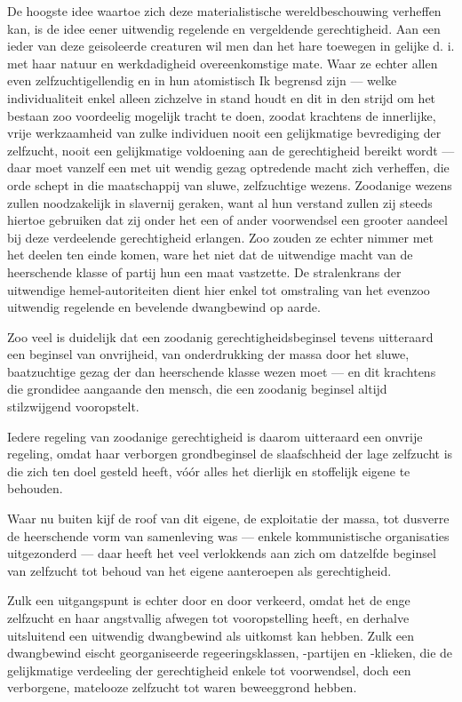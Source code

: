 \documentclass[a4paper, 12pt, oneside, dutch]{article}
\begin{document}
De hoogste idee waartoe zich deze materialistische wereldbeschouwing verheffen kan, is de idee eener uitwendig regelende en vergeldende gerechtigheid. Aan een ieder van deze geisoleerde creaturen wil men dan het hare toewegen in gelijke d. i. met haar natuur en werkdadigheid overeenkomstige mate. Waar ze echter allen even zelfzuchtigellendig en in hun atomistisch Ik begrensd zijn --- welke individualiteit enkel alleen zichzelve in stand houdt en dit in den strijd om het bestaan zoo voordeelig mogelijk tracht te doen, zoodat krachtens de innerlijke, vrije werkzaamheid van zulke individuen nooit een gelijkmatige bevrediging der zelfzucht, nooit een gelijkmatige voldoening aan de gerechtigheid bereikt wordt --- daar moet vanzelf een met uit wendig gezag optredende macht zich verheffen, die orde schept in die maatschappij van sluwe, zelfzuchtige wezens. Zoodanige wezens zullen noodzakelijk in slavernij geraken, want al hun verstand zullen zij steeds hiertoe gebruiken dat zij onder het een of ander voorwendsel een grooter aandeel bij deze verdeelende gerechtigheid erlangen. Zoo zouden ze echter nimmer met het deelen ten einde komen, ware het niet dat de uitwendige macht van de heerschende klasse of partij hun een maat vastzette. De stralenkrans der uitwendige hemel-autoriteiten dient hier enkel tot omstraling van het evenzoo uitwendig regelende en bevelende dwangbewind op aarde.

Zoo veel is duidelijk dat een zoodanig gerechtigheidsbeginsel tevens uitteraard een beginsel van onvrijheid, van onderdrukking der massa door het sluwe, baatzuchtige gezag der dan heerschende klasse wezen moet --- en dit krachtens die grondidee aangaande den mensch, die een zoodanig beginsel altijd stilzwijgend vooropstelt.

Iedere regeling van zoodanige gerechtigheid is daarom uitteraard een onvrije regeling, omdat haar verborgen grondbeginsel de slaafschheid der lage zelfzucht is die zich ten doel gesteld heeft, vóór alles het dierlijk en stoffelijk eigene te behouden.

Waar nu buiten kijf de roof van dit eigene, de exploitatie der massa, tot dusverre de heerschende vorm van samenleving was --- enkele kommunistische organisaties uitgezonderd --- daar heeft het veel verlokkends aan zich om datzelfde beginsel van zelfzucht tot behoud van het eigene aanteroepen als gerechtigheid.

Zulk een uitgangspunt is echter door en door verkeerd, omdat het de enge zelfzucht en haar angstvallig afwegen tot vooropstelling heeft, en derhalve uitsluitend een uitwendig dwangbewind als uitkomst kan hebben. Zulk een dwangbewind eischt georganiseerde regeeringsklassen, -partijen en -klieken, die de gelijkmatige verdeeling der gerechtigheid enkele tot voorwendsel, doch een verborgene, matelooze zelfzucht tot waren beweeggrond hebben.
\end{document}
